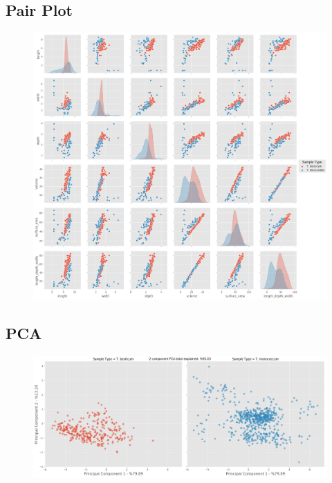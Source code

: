\documentclass[11pt]{report}
\begin{document}
\subsection{Pair Plot}
\label{sec:orgdc5ade8}

\begin{figure}[htbp]
\centering
\includegraphics[width=18cm]{./images/results/group2/pairplot.png}
\label{fig:orgcbafd10}
\end{figure}

\clearpage
\subsection{PCA}
\label{sec:org5f733bf}
\begin{figure}[htbp]
\centering
\includegraphics[width=18cm]{./images/results/group2/pca.png}
\label{fig:org8d9eace}
\end{figure}
\end{document}
